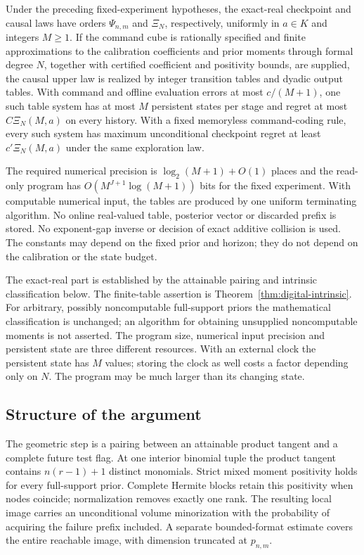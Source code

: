 \begin{theorem}
\label{thm:effective-main}
Under the preceding fixed-experiment hypotheses, the exact-real
checkpoint and causal laws have orders $\Psi_{n,m}$ and $\Xi_N$,
respectively, uniformly in $a\in K$ and integers $M\ge1$.
If the command cube is rationally specified and finite approximations
to the calibration coefficients and prior moments through formal degree
$N$, together with certified coefficient and positivity bounds, are supplied, the causal upper law is realized by integer transition
tables and dyadic output tables. With command and offline evaluation
errors at most $c/(M+1)$, one such table system has at most $M$
persistent states per stage and regret at most $C\Xi_N(M,a)$ on
every history. With a fixed memoryless command-coding rule, every such
system has maximum unconditional checkpoint
regret at least $c'\Xi_N(M,a)$ under the same exploration law.

The required numerical precision is $\log_2(M+1)+O(1)$ places and the
read-only program has $O(M^{J+1}\log(M+1))$ bits for the fixed
experiment. With computable numerical input, the tables are produced
by one uniform terminating algorithm. No online real-valued table,
posterior vector or discarded prefix is stored. No exponent-gap inverse
or decision of exact additive collision is used. The constants may
depend on the fixed prior and horizon; they do not depend on the
calibration or the state budget.
\end{theorem}

The exact-real part is established by the attainable pairing and intrinsic
classification below. The finite-table assertion is
Theorem~\ref{thm:digital-intrinsic}. For arbitrary, possibly noncomputable
full-support priors the mathematical classification is unchanged; an
algorithm for obtaining unsupplied noncomputable moments is not asserted.
The program size, numerical input precision and persistent state are
three different resources. With an external clock the persistent state
has $M$ values; storing the clock as well costs a factor depending only
on $N$. The program may be much larger than its changing state.

\subsection{Structure of the argument}
The geometric step is a pairing between an attainable product tangent
and a complete future test flag. At one interior binomial tuple the
product tangent contains $n(r-1)+1$ distinct monomials. Strict mixed
moment positivity holds for every full-support prior. Complete Hermite
blocks retain this positivity when nodes coincide; normalization removes
exactly one rank. The resulting local image carries an unconditional
volume minorization with the probability of acquiring the failure prefix
included. A separate bounded-format estimate covers the entire reachable
image, with dimension truncated at $p_{n,m}$.

